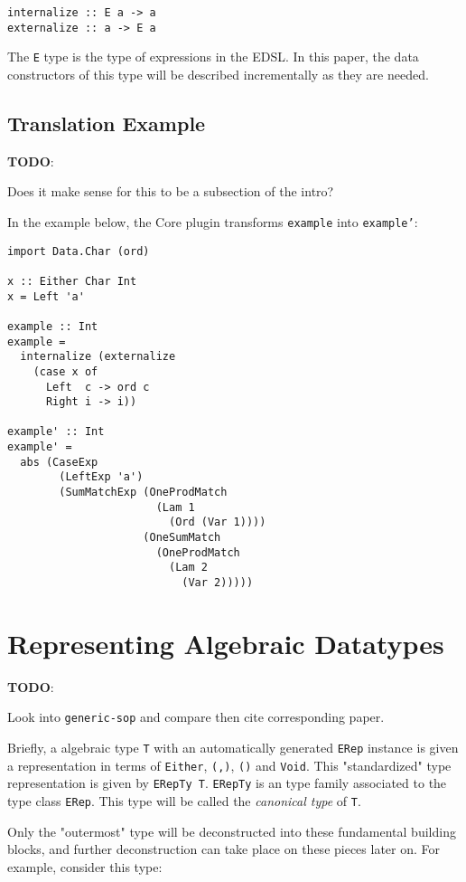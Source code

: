 \documentclass[sigplan,anonymous,review]{acmart}
\newcommand{\ttt}{\texttt}
\newenvironment{todo}
  {\begin{tcolorbox}
   \textbf{TODO}:
  }
  {\end{tcolorbox}
  }
\begin{document}
\begin{lstlisting}
internalize :: E a -> a
externalize :: a -> E a
\end{lstlisting}

The \ttt{E} type is the type of expressions in the EDSL.  In this paper, the
data constructors of this type will be described incrementally as they
are needed.

\subsection{Translation Example}
\begin{todo}
  Does it make sense for this to be a subsection of the intro?
\end{todo}

In the example below, the Core plugin transforms \ttt{example} into \ttt{example'}:
\begin{lstlisting}[deletekeywords={Ord}]
import Data.Char (ord)

x :: Either Char Int
x = Left 'a'

example :: Int
example =
  internalize (externalize
    (case x of
      Left  c -> ord c
      Right i -> i))

example' :: Int
example' =
  abs (CaseExp
        (LeftExp 'a')
        (SumMatchExp (OneProdMatch
                       (Lam 1
                         (Ord (Var 1))))
                     (OneSumMatch
                       (OneProdMatch
                         (Lam 2
                           (Var 2)))))
\end{lstlisting}

\section{Representing Algebraic Datatypes}

\begin{todo}
  Look into \ttt{generic-sop} and compare then cite corresponding paper.
\end{todo}

Briefly, a algebraic type \ttt{T} with an automatically generated \ttt{ERep}
instance is given a representation in terms of \ttt{Either}, \ttt{(,)}, \ttt{()}
and \ttt{Void}.  This "standardized" type representation is given by \ttt{ERepTy
T}. \ttt{ERepTy} is an type family associated to the type class \ttt{ERep}. This
type will be called the \textit{canonical type} of \ttt{T}.

Only the "outermost" type will be deconstructed into these fundamental building
blocks, and further deconstruction can take place on these pieces later on. For
example, consider this type:
\end{document}
